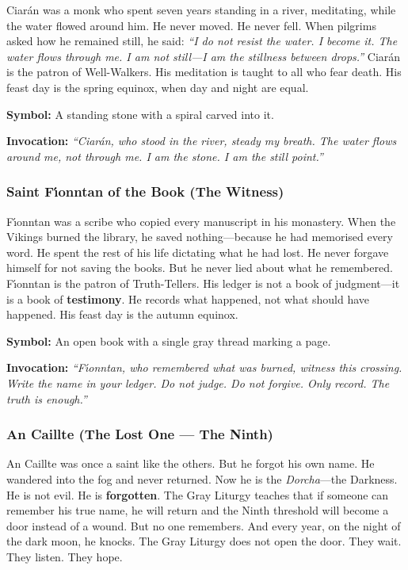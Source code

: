 Ciar\'an was a monk who spent seven years standing in a river, meditating, while the water flowed around him. He never moved. He never fell. When pilgrims asked how he remained still, he said: \textit{``I do not resist the water. I become it. The water flows through me. I am not still---I am the stillness between drops.''} Ciar\'an is the patron of Well-Walkers. His meditation is taught to all who fear death. His feast day is the spring equinox, when day and night are equal.

\textbf{Symbol:} A standing stone with a spiral carved into it.

\textbf{Invocation:} \textit{``Ciar\'an, who stood in the river, steady my breath. The water flows around me, not through me. I am the stone. I am the still point.''}

\subsubsection*{Saint F\'{\i}onntan of the Book (The Witness)}

F\'{\i}onntan was a scribe who copied every manuscript in his monastery. When the Vikings burned the library, he saved nothing---because he had memorised every word. He spent the rest of his life dictating what he had lost. He never forgave himself for not saving the books. But he never lied about what he remembered. F\'{\i}onntan is the patron of Truth-Tellers. His ledger is not a book of judgment---it is a book of \textbf{testimony}. He records what happened, not what should have happened. His feast day is the autumn equinox.

\textbf{Symbol:} An open book with a single gray thread marking a page.

\textbf{Invocation:} \textit{``F\'{\i}onntan, who remembered what was burned, witness this crossing. Write the name in your ledger. Do not judge. Do not forgive. Only record. The truth is enough.''}

\subsubsection*{An Caillte (The Lost One --- The Ninth)}

An Caillte was once a saint like the others. But he forgot his own name. He wandered into the fog and never returned. Now he is the \textit{Dorcha}---the Darkness. He is not evil. He is \textbf{forgotten}. The Gray Liturgy teaches that if someone can remember his true name, he will return and the Ninth threshold will become a door instead of a wound. But no one remembers. And every year, on the night of the dark moon, he knocks. The Gray Liturgy does not open the door. They wait. They listen. They hope.

